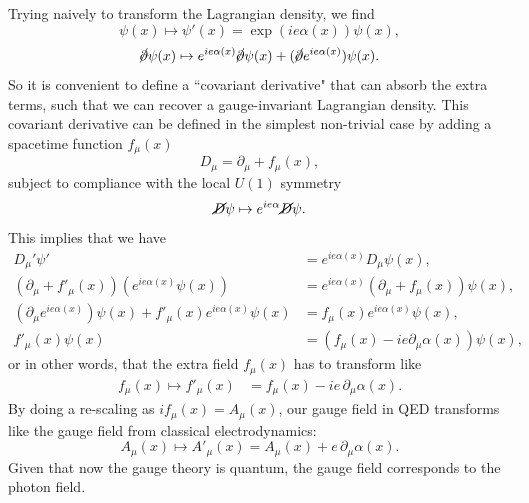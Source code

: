 \documentclass[a4paper]{report}
\begin{document}
\begin{spacing}{1.1}
Trying naively to transform the Lagrangian density, we find
\begin{equation}
    \psi(x) \mapsto \psi'(x) = \exp(ie\alpha(x))\psi(x),
\end{equation}
\begin{equation}
    \cancel\partial \psi(x) \mapsto e^{ie\alpha(x)} \cancel\partial \psi(x) + (\cancel\partial e^{ie\alpha(x)} ) \psi(x).
\end{equation}
So it is convenient to define a ``covariant derivative" that can absorb the extra terms, such that we can recover a gauge-invariant Lagrangian density. This covariant derivative can be defined in the simplest non-trivial case by adding a spacetime function $f_\mu(x)$
\begin{equation}
    D_\mu = \partial_\mu + f_\mu(x),
\end{equation}
subject to compliance with the local $U(1)$ symmetry
\begin{equation}
    \cancel{D}\psi \mapsto e^{ie\alpha}\cancel{D}\psi.
\end{equation}
This implies that we have
\begin{align}
    D_\mu'\psi' &= e^{ie\alpha(x)}D_\mu \psi(x), \\
    (\partial_\mu + f'_\mu(x))(e^{ie\alpha(x)} \psi(x))&= e^{ie\alpha(x)} (\partial_\mu +f_\mu(x))\psi(x), \\
    (\partial_\mu e^{ie\alpha(x)})\psi(x) + f'_\mu(x) e^{ie\alpha(x)}\psi(x) &= f_\mu(x)e^{ie\alpha(x)}\psi(x), \\
    f'_\mu(x) \psi(x) &= (f_\mu(x) - ie\partial_\mu \alpha(x)) \psi(x),
\end{align}
or in other words, that the extra field $f_\mu(x)$ has to transform like
\begin{align}
    f_\mu(x) \mapsto f'_\mu(x) &= f_\mu(x) - ie\,\partial_\mu \alpha(x).
\end{align}
By doing a re-scaling as $i f_\mu(x) = A_\mu(x)$, our gauge field in QED transforms like the gauge field from classical electrodynamics:
\begin{equation}
    A_\mu(x) \mapsto A'_\mu(x) = A_\mu(x) + e\,\partial_\mu \alpha(x).
\end{equation}
Given that now the gauge theory is quantum, the gauge field corresponds to the photon field.



\end{spacing}
\end{document}
